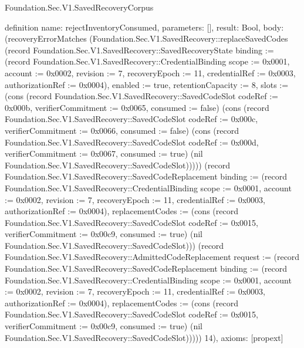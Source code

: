 \begin{lexlean}{Foundation.Sec.V1.SavedRecoveryCorpus}
\begin{semanticmodule}
definition{
  name: rejectInventoryConsumed,
  parameters: [],
  result: Bool,
  body: (recoveryErrorMatches (Foundation.Sec.V1.SavedRecovery::replaceSavedCodes (record Foundation.Sec.V1.SavedRecovery::SavedRecoveryState {binding := (record Foundation.Sec.V1.SavedRecovery::CredentialBinding {scope := 0x0001, account := 0x0002, revision := 7, recoveryEpoch := 11, credentialRef := 0x0003, authorizationRef := 0x0004}), enabled := true, retentionCapacity := 8, slots := (cons (record Foundation.Sec.V1.SavedRecovery::SavedCodeSlot {codeRef := 0x000b, verifierCommitment := 0x0065, consumed := false}) (cons (record Foundation.Sec.V1.SavedRecovery::SavedCodeSlot {codeRef := 0x000c, verifierCommitment := 0x0066, consumed := false}) (cons (record Foundation.Sec.V1.SavedRecovery::SavedCodeSlot {codeRef := 0x000d, verifierCommitment := 0x0067, consumed := true}) (nil Foundation.Sec.V1.SavedRecovery::SavedCodeSlot))))}) (record Foundation.Sec.V1.SavedRecovery::SavedCodeReplacement {binding := (record Foundation.Sec.V1.SavedRecovery::CredentialBinding {scope := 0x0001, account := 0x0002, revision := 7, recoveryEpoch := 11, credentialRef := 0x0003, authorizationRef := 0x0004}), replacementCodes := (cons (record Foundation.Sec.V1.SavedRecovery::SavedCodeSlot {codeRef := 0x0015, verifierCommitment := 0x00c9, consumed := true}) (nil Foundation.Sec.V1.SavedRecovery::SavedCodeSlot))}) (record Foundation.Sec.V1.SavedRecovery::AdmittedCodeReplacement {request := (record Foundation.Sec.V1.SavedRecovery::SavedCodeReplacement {binding := (record Foundation.Sec.V1.SavedRecovery::CredentialBinding {scope := 0x0001, account := 0x0002, revision := 7, recoveryEpoch := 11, credentialRef := 0x0003, authorizationRef := 0x0004}), replacementCodes := (cons (record Foundation.Sec.V1.SavedRecovery::SavedCodeSlot {codeRef := 0x0015, verifierCommitment := 0x00c9, consumed := true}) (nil Foundation.Sec.V1.SavedRecovery::SavedCodeSlot))})})) 14),
  axioms: [propext]
}


\end{semanticmodule}
\end{lexlean}
